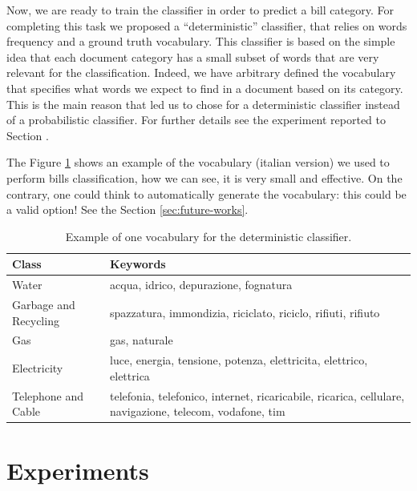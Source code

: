 \documentclass[10pt,twocolumn,letterpaper]{article}
\begin{document}
Now, we are ready to train the classifier in order to predict a bill
category. For completing this task we proposed a ``deterministic''
classifier, that relies on words frequency and a ground truth
vocabulary. This classifier is based on the simple idea that each
document category has a small subset of words that are very relevant
for the classification. Indeed, we have arbitrary defined the
vocabulary that specifies what words we expect to find in a document
based on its category. This is the main reason that led us to chose
for a deterministic classifier instead of a probabilistic classifier.
For further details see the experiment reported to Section
\label{subsec:classification-naive-bayes}.

The Figure \ref{table:determnistic-classifier-dict} shows an example
of the vocabulary (italian version) we used to perform bills
classification, how we can see, it is very small and effective.
On the contrary, one could think to automatically generate the
vocabulary: this could be a valid option! See the Section
\ref{sec:future-works}.

\bgroup
\def\arraystretch{1.3}%
\begin{table}[!h]
  \begin{center}
    \begin{tabular}{p{2cm} p{5cm}}
      \hline
      Class & Keywords \\ \hline
      Water & acqua, idrico, depurazione, fognatura \\
      Garbage and Recycling & spazzatura, immondizia, riciclato, riciclo, rifiuti, rifiuto \\
      Gas & gas, naturale \\
      Electricity & luce, energia, tensione, potenza, elettricita, elettrico, elettrica \\
      Telephone and Cable & telefonia, telefonico, internet, ricaricabile, ricarica, cellulare, navigazione, telecom, vodafone, tim \\ \hline
    \end{tabular}
  \end{center}
  \label{table:determnistic-classifier-dict}
  \caption{Example of one vocabulary for the deterministic classifier.}
\end{table}
\egroup

\section{Experiments}
\label{sec:experiments}
\end{document}
